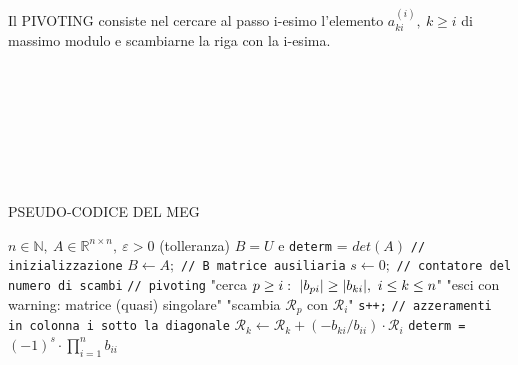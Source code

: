 \documentclass[12pt,a4paper]{article}
\DeclarePairedDelimiter{\abs}{\lvert}{\rvert}
\begin{document}
Il PIVOTING consiste nel cercare al passo i-esimo l'elemento $a_{ki}^{(i)}, \ k \ge i$ di massimo modulo e scambiarne la riga con la i-esima.\\\\\\\\\\\\\\\\
\begin{algorithm}
\caption{PSEUDO-CODICE DEL MEG}
\begin{algorithmic}
    \REQUIRE $n \in \mathbb{N}, \ A \in \mathbb{R}^{n \times n}, \ \varepsilon > 0$ (tolleranza)
    \ENSURE $B = U$ e \verb|determ| = $det(A)$
    \STATE \verb|// inizializzazione|
    \STATE $B \leftarrow A;$ \verb|// B matrice ausiliaria|
    \STATE $s \leftarrow 0;$ \verb|// contatore del numero di scambi|
        \STATE \verb|// pivoting|
        \STATE "cerca $p \ge i: \ \abs{b_{pi}} \ge \abs{b_{ki}}, \ i \le k \le n$"
            \STATE "esci con warning: matrice (quasi) singolare"
        \ENDIF
            \STATE "scambia $\mathcal{R}_p$ con $\mathcal{R}_i$"
            \STATE \verb|s++;|
        \ENDIF
        \STATE \verb|// azzeramenti in colonna i sotto la diagonale|
            \STATE $\mathcal{R}_k \leftarrow \mathcal{R}_k + (-b_{ki}/b_{ii}) \cdot \mathcal{R}_i$
        \ENDFOR
    \ENDFOR
    \STATE \verb|determ = | $(-1)^s \cdot \prod_{i=1}^n b_{ii}$
\end{algorithmic}
\end{algorithm}\\\\\\\\\\\
\end{document}
